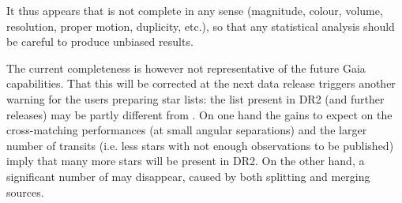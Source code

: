It thus appears that {} is not complete in any sense (magnitude,
colour, volume, resolution, proper motion, duplicity, etc.), so that any
statistical analysis should be careful to produce unbiased results.

The current completeness is however not representative of the future Gaia capabilities. 
That this will be corrected at the next data release triggers another
warning for the users preparing star lists: the  list present in DR2 
(and further releases) may be partly different from {}. 
On one hand the gains to expect on the 
cross-matching performances (at small angular separations) and the larger number 
of transits (i.e. less stars with not enough observations to be published)
imply that many more stars will be present in DR2. On the other hand, a significant
number of  may disappear, caused by both splitting and merging sources.




